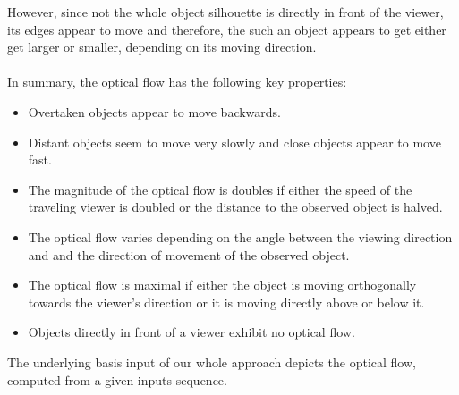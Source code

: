 However, since not the whole object silhouette is directly in front of the viewer, its edges appear to move and therefore, the such an object appears to get either get larger or smaller, depending on its moving direction. \\ \\
In summary, the optical flow has the following key properties:
\begin{itemize}
  \item Overtaken objects appear to move backwards.
  \item Distant objects seem to move very slowly and close objects appear to move fast.
  \item The magnitude of the optical flow is doubles if either the speed of the traveling viewer is doubled or the distance to the observed object is halved.
  \item The optical flow varies depending on the angle between the viewing direction and and the direction of movement of the observed object.
  \item The optical flow is maximal if either the object is moving orthogonally towards the viewer's direction or it is moving directly above or below it.
  \item Objects directly in front of a viewer exhibit no optical flow.
\end{itemize}
The underlying basis input of our whole approach depicts the optical flow, computed from a given inputs sequence.

